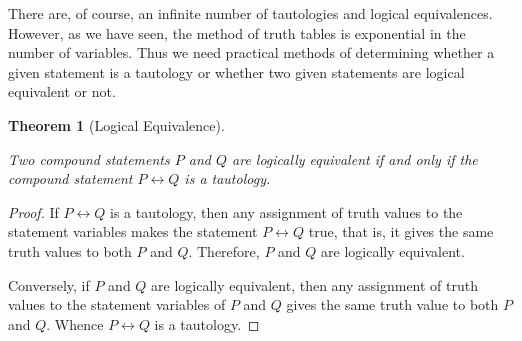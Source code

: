 \documentclass[
  letterpaper,
  10pt,
  reqno,
  twopage,
  openany]{book}
\theoremstyle{plain}
\theoremstyle{definition}
\theoremstyle{definition}
\theoremstyle{definition}
\theoremstyle{plain}
\theoremstyle{plain}
\newtheorem{theorem}{Theorem}[chapter]
\theoremstyle{remark}
\begin{document}
There are, of course, an infinite number of tautologies and logical
equivalences. However, as we have seen, the method of truth tables is
exponential in the number of variables. Thus we need practical methods
of determining whether a given statement is a tautology or whether two
given statements are logical equivalent or not.

\leavevmode{}%
\begin{theorem}[Logical Equivalence]\label{thm-equitaut}

Two compound statements \(P\) and \(Q\) are logically equivalent if and
only if the compound statement \(P\leftrightarrow Q\) is a tautology.

\end{theorem}

\begin{proof}

If \(P\leftrightarrow Q\) is a tautology, then any assignment of truth
values to the statement variables makes the statement
\(P\leftrightarrow Q\) true, that is, it gives the same truth values to
both \(P\) and \(Q\). Therefore, \(P\) and \(Q\) are logically
equivalent.

Conversely, if \(P\) and \(Q\) are logically equivalent, then any
assignment of truth values to the statement variables of \(P\) and \(Q\)
gives the same truth value to both \(P\) and \(Q\). Whence
\(P\leftrightarrow Q\) is a tautology.

\end{proof}
\end{document}
